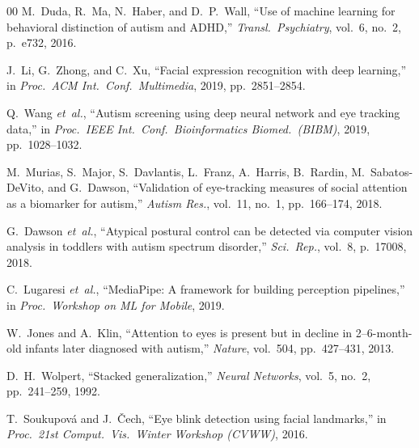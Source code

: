 \documentclass[conference]{IEEEtran}
\begin{document}
\begin{thebibliography}{00}
M.~Duda, R.~Ma, N.~Haber, and D.~P.~Wall, ``Use of machine learning for behavioral distinction of autism and ADHD,'' \textit{Transl.~Psychiatry}, vol.~6, no.~2, p.~e732, 2016.

J.~Li, G.~Zhong, and C.~Xu, ``Facial expression recognition with deep learning,'' in \textit{Proc.~ACM Int.~Conf.~Multimedia}, 2019, pp.~2851--2854.

Q.~Wang \textit{et~al.}, ``Autism screening using deep neural network and eye tracking data,'' in \textit{Proc.~IEEE Int.~Conf.~Bioinformatics Biomed.~(BIBM)}, 2019, pp.~1028--1032.

M.~Murias, S.~Major, S.~Davlantis, L.~Franz, A.~Harris, B.~Rardin, M.~Sabatos-DeVito, and G.~Dawson, ``Validation of eye-tracking measures of social attention as a biomarker for autism,'' \textit{Autism Res.}, vol.~11, no.~1, pp.~166--174, 2018.

G.~Dawson \textit{et~al.}, ``Atypical postural control can be detected via computer vision analysis in toddlers with autism spectrum disorder,'' \textit{Sci.~Rep.}, vol.~8, p.~17008, 2018.

C.~Lugaresi \textit{et~al.}, ``MediaPipe: A framework for building perception pipelines,'' in \textit{Proc.~Workshop on ML for Mobile}, 2019.

W.~Jones and A.~Klin, ``Attention to eyes is present but in decline in 2--6-month-old infants later diagnosed with autism,'' \textit{Nature}, vol.~504, pp.~427--431, 2013.

D.~H.~Wolpert, ``Stacked generalization,'' \textit{Neural Networks}, vol.~5, no.~2, pp.~241--259, 1992.

T.~Soukupov\'{a} and J.~\v{C}ech, ``Eye blink detection using facial landmarks,'' in \textit{Proc.~21st Comput.~Vis.~Winter Workshop (CVWW)}, 2016.

\end{thebibliography}
\end{document}
